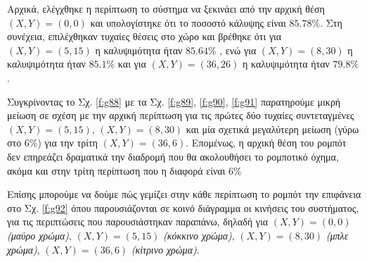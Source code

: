 Αρχικά, ελέγχθηκε η περίπτωση το σύστημα να ξεκινάει από την αρχική θέση $(X,Y) = (0,0)$ και υπολογίστηκε ότι το ποσοστό κάλυψης είναι $85.78\%$. Στη συνέχεια, επιλέχθηκαν τυχαίες θέσεις στο χώρο και βρέθηκε ότι για $(X,Y) = (5,15)$ η καλυψιμότητα ήταν $85.64\%$ , ενώ για $(X,Y) = (8,30)$ η καλυψιμότητα ήταν $85.1\%$ και για $(X,Y) = (36,26)$ η καλυψιμότητα ήταν $79.8\%$. 

Συγκρίνοντας το Σχ. \ref{f:g88} με τα Σχ. \ref{f:g89}, \ref{f:g90}, \ref{f:g91} παρατηρούμε μικρή μείωση σε σχέση με την αρχική περίπτωση για τις πρώτες δύο τυχαίες συντεταγμένες $(X,Y) = (5,15)$, $(X,Y) = (8,30)$ και μία σχετικά μεγαλύτερη μείωση (γύρω στο $6\%$) για την τρίτη $(X,Y) = (36,6)$. Επομένως, η αρχική θέση του ρομπότ δεν επηρεάζει δραματικά την διαδρομή που θα ακολουθήσει το ρομποτικό όχημα, ακόμα και στην τρίτη περίπτωση που η διαφορά είναι  $6\%$

Επίσης μπορούμε να δούμε πώς γεμίζει στην κάθε περίπτωση το ρομπότ την επιφάνεια στο Σχ. \ref{f:g92} όπου
παρουσιάζονται σε κοινό διάγραμμα οι κινήσεις του συστήματος, για τις περιπτώσεις που παρουσιάστηκαν παραπάνω, δηλαδή για $(X,Y) = (0,0)$ \emph{(μαύρο χρώμα)}, $(X,Y) = (5,15)$ \emph{(κόκκινο χρώμα)}, $(X,Y) = (8,30)$ \emph{(μπλε χρώμα)}, $(X,Y) = (36,6)$ \emph{(κίτρινο χρώμα)}.

